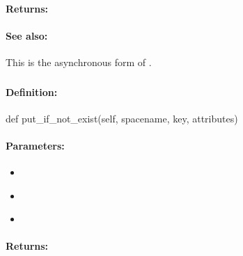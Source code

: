 \paragraph{Returns:}


\paragraph{See also:}  This is the asynchronous form of .

\pagebreak
\subsubsection{}
\label{api:python:put_if_not_exist}


\paragraph{Definition:}
\begin{pythoncode}
def put_if_not_exist(self, spacename, key, attributes)
\end{pythoncode}

\paragraph{Parameters:}
\begin{itemize}[noitemsep]
\item {}\\

\item {}\\

\item {}\\

\end{itemize}

\paragraph{Returns:}


\pagebreak
\subsubsection{}
\label{api:python:async_put_if_not_exist}


